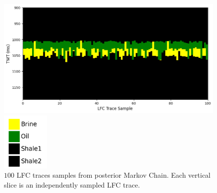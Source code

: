 \documentclass[note,screen,english,12pt,utf8]{nrdoc}
\begin{document}
\begin{figure}[htbp]
    \begin{minipage}[valign=t]{0.9\textwidth}
        \includegraphics[width=\textwidth]{figures/lfc_traces_sampled_il57_xl62.png}
    \end{minipage}%
    \begin{minipage}[valign=t]{0.1\textwidth}
        \includegraphics[width=\textwidth]{figures/lfc_legend.png}
    \end{minipage}
    \caption{$100$ LFC traces samples from posterior Markov Chain.
             Each vertical slice is an independently sampled LFC trace.
    }
    \label{fig:lfc_traces}
\end{figure}
\end{document}
